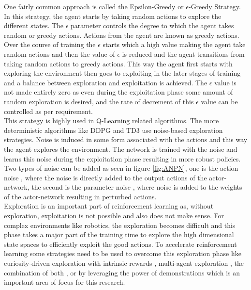 One fairly common approach is called the Epsilon-Greedy or $\epsilon$-Greedy Strategy. In this strategy, the agent starts by taking random actions to explore the different states. The $\epsilon$ parameter controls the degree to which the agent takes random or greedy actions. Actions from the agent are known as greedy actions. Over the course of training the $\epsilon$ starts which a high value making the agent take random actions and then the value of $\epsilon$ is reduced and the agent transitions from taking random actions to greedy actions. This way the agent first starts with exploring the environment then goes to exploiting in the later stages of training and a balance between exploration and exploitation is achieved. The $\epsilon$ value is not made entirely zero as even during the exploitation phase some amount of random exploration is desired, and the rate of decrement of this $\epsilon$ value can be controlled as per requirement. \\

This strategy is highly used in Q-Learning related algorithms. The more deterministic algorithms like DDPG and TD3 use noise-based exploration strategies. Noise is induced in some form associated with the actions and this way the agent explores the environment. The network is trained with the noise and learns this noise during the exploitation phase resulting in more robust policies. Two types of noise can be added as seen in figure \ref{fig:ANPN}, one is the action noise \cite{lillicrap2019continuous} \cite{fujimoto2018addressing}, where the noise is directly added to the output actions of the actor-network, the second is the parameter noise \cite{plappert2018parameter}, where noise is added to the weights of the actor-network resulting in perturbed actions. \\

Exploration is an important part of reinforcement learning as, without exploration, exploitation is not possible and also does not make sense. For complex environments like robotics, the exploration becomes difficult and this phase takes a major part of the training time to explore the high dimensional state spaces to efficiently exploit the good actions. To accelerate reinforcement learning some strategies need to be used to overcome this exploration phase like curiosity-driven exploration with intrinsic rewards \cite{burda2018exploration}, multi-agent exploration \cite{lowe2020multiagent}, the combination of both \cite{lanier2019curiositydriven}, or by leveraging the power of demonstrations which is an important area of focus for this research. \\

